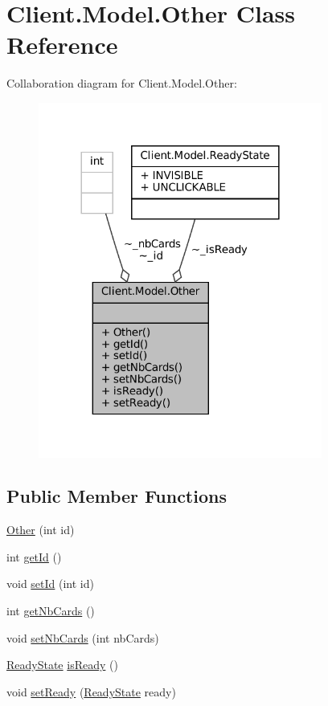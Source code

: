 \hypertarget{classClient_1_1Model_1_1Other}{}\section{Client.\+Model.\+Other Class Reference}
\label{classClient_1_1Model_1_1Other}


Collaboration diagram for Client.\+Model.\+Other\+:
\nopagebreak
\begin{figure}[H]
\begin{center}
\leavevmode
\includegraphics[width=264pt]{classClient_1_1Model_1_1Other__coll__graph}
\end{center}
\end{figure}
\subsection*{Public Member Functions}
\begin{DoxyCompactItemize}
\item 
\mbox{\hyperlink{classClient_1_1Model_1_1Other_a90aa8eae420b2d79005975df8ac0b120}{Other}} (int id)
\item 
int \mbox{\hyperlink{classClient_1_1Model_1_1Other_afa3b96824bac044a570833d3e829e14e}{get\+Id}} ()
\item 
void \mbox{\hyperlink{classClient_1_1Model_1_1Other_ab6220f1b2ff6b125d99d58deb84e0079}{set\+Id}} (int id)
\item 
int \mbox{\hyperlink{classClient_1_1Model_1_1Other_ae0917c370d73e73fc2e4ebfa9049e952}{get\+Nb\+Cards}} ()
\item 
void \mbox{\hyperlink{classClient_1_1Model_1_1Other_a4cfa780b4d0bdb50a553687ba49cd7f8}{set\+Nb\+Cards}} (int nb\+Cards)
\item 
\mbox{\hyperlink{enumClient_1_1Model_1_1ReadyState}{Ready\+State}} \mbox{\hyperlink{classClient_1_1Model_1_1Other_a2441862fc21c750ebaf88b87af040d14}{is\+Ready}} ()
\item 
void \mbox{\hyperlink{classClient_1_1Model_1_1Other_a46277632c220da183bbcde7e27688456}{set\+Ready}} (\mbox{\hyperlink{enumClient_1_1Model_1_1ReadyState}{Ready\+State}} ready)
\end{DoxyCompactItemize}


